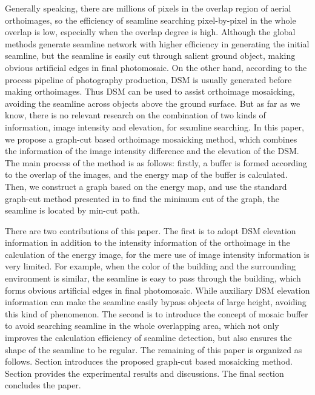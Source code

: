 \documentclass[journal]{IEEEtran}
\begin{document}
Generally speaking, there are millions of pixels in the overlap region of aerial orthoimages, so the efficiency of seamline searching pixel-by-pixel in the whole overlap is low, especially when the overlap degree is high. Although the global methods generate seamline network with higher efficiency in generating the initial seamline, but the seamline is easily cut through salient ground object, making obvious artificial edges in final photomosaic. On the other hand, according to the process pipeline of photography production, DSM is usually generated before making orthoimages\cite{Mills2013}. Thus DSM can be used to assist orthoimage mosaicking, avoiding the seamline across objects above the ground surface. But as far as we know, there is no relevant research on the combination of two kinds of information, image intensity and elevation, for seamline searching. In this paper, we propose a graph-cut based orthoimage mosaicking method, which combines the information of the image intensity difference and the elevation of the DSM. The main process of the method is as follows: firstly, a buffer is formed according to the overlap of the images, and the energy map of the buffer is calculated. Then, we construct a graph based on the energy map, and use the standard graph-cut method presented in \cite{Boykov2004} to find the minimum cut of the graph, the seamline is located by min-cut path.

There are two contributions of this paper. The first is to adopt DSM elevation information in addition to the intensity information of the orthoimage in the calculation of the energy image, for the mere use of image intensity information is very limited. For example, when the color of the building and the surrounding environment is similar, the seamline is easy to pass through the building, which forms obvious artificial edges in final photomosaic. While auxiliary DSM elevation information can make the seamline easily bypass objects of large height, avoiding this kind of phenomenon. The second is to introduce the concept of mosaic buffer to avoid searching seamline in the whole overlapping area, which not only improves the calculation efficiency of seamline detection, but also ensures the shape of the seamline to be regular.
The remaining of this paper is organized as follows. Section \uppercase\expandafter{} introduces the proposed graph-cut based mosaicking method. Section \uppercase\expandafter{} provides the experimental results and discussions. The final section concludes the paper.
\end{document}
